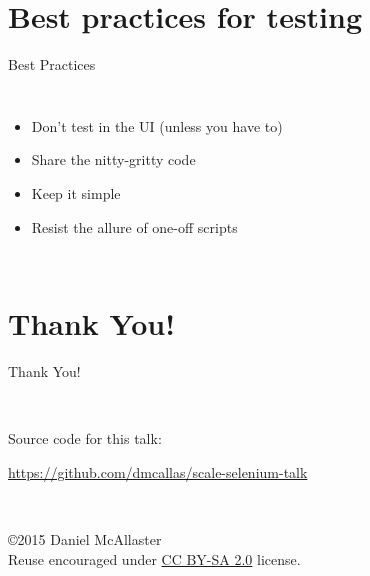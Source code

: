 \documentclass[14pt]{beamer}
\begin{document}
\section[Best Practices]{Best practices for testing}

\begin{frame}
Best Practices
\begin{columns}
  \column{3in}
  \begin{itemize}
  \item<1-> Don't test in the UI (unless you have to)
  \item<2-> Share the nitty-gritty code
  \item<3-> Keep it simple
  \item<4-> Resist the allure of one-off scripts
  \end{itemize}
  \column{3in}
\end{columns}
\end{frame}


\section[]{Thank You!}
\begin{frame}
  \begin{center}
    \begin{Large}
      Thank You!
    \end{Large}\\
    \vspace{1cm}

    Source code for this talk:\\
    \begin{small}\url{https://github.com/dmcallas/scale-selenium-talk}\end{small}\\
    \vspace{1cm}
    \begin{small}
      \copyright2015 Daniel McAllaster\\
      Reuse encouraged under \href{https://creativecommons.org/licenses/by-sa/2.0/}{CC BY-SA 2.0} license.
    \end{small}
  \end{center}
\end{frame}
\end{document}
